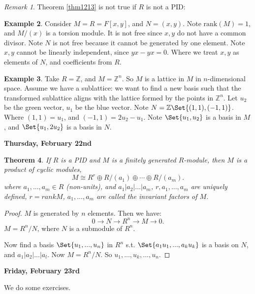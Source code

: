 \documentclass[9pt,reqno,twoside]{amsbook}
\theoremstyle{plain}
\newtheorem{theorem}{Theorem}[chapter]
\numberwithin{section}{chapter}
\numberwithin{equation}{chapter}
\theoremstyle{definition}
\newtheorem{Ex}[theorem]{Example}
\theoremstyle{remark}
\newtheorem{rem}[theorem]{Remark}
\theoremstyle{plain}
\newcommand{\z}{\mathbb{Z}}
\newcommand{\rank}{\text{rank}}
\begin{document}
\begin{rem}
Theorem \ref{thm1213} is not true if $R$ is not a PID:
\end{rem}

\begin{Ex}
Consider $M = R = F[x,y]$, and $N = (x,y)$. Note $\rank (M) = 1$, and $M/(x)$ is a torsion module. It is not free since $x,y$ do not have a common divisor. Note $N$ is not free because it cannot be generated by one element. Note $x,y$ cannot be linearly independent, since $yx - yx = 0$. Where we treat $x,y$ as elements of $N$, and coefficients from $R$. 
\end{Ex}

\begin{Ex}
Take $R = \z$, and $M = \z^n$. So $M$ is a lattice in $M$ in $n$-dimensional space. Assume we have a sublattice: we want to find a new basis such that the transformed sublattice aligns with the lattice formed by the points in $\z^n$. Let $u_2$ be the green vector, $u_1$ be the blue vector. Note $N = \z\Set{(1,1),(-1,1)}$. Where $(1,1) = u_1$, and $(-1,1) = 2u_2 - u_1$. Note $\Set{u_1,u_2}$ is a basis in $M$, and $\Set{u_1,2u_2}$ is a basis in $N$. 
\end{Ex}

\textbf{Thursday, February 22nd}

\begin{theorem}
If $R$ is a PID and $M$ is a finitely generated $R$-module, then $M$ is a product of cyclic modules, 
$$
M \cong R^r \oplus R/(a_1) \oplus \cdots \oplus R/(a_m).
$$
where $a_1,...,a_m \in R$ (non-units), and $a_1|a_2|...|a_m$,
 $r,a_1,...,a_m$ are uniquely defined, $r = rank M$, $a_1,...,a_m$ are called the invariant factors of $M$. 
\end{theorem}

\begin{proof}
$M$ is generated by $n$ elements. Then we have:
$$
0 \to N \to R^n \to M \to 0.
$$
$M = R^n/N$, where $N$ is a submodule of $R^n$. 

Now find a basis $\Set{u_1,...,u_n}$ in $R^n$ s.t. $\Set{a_1u_1,...,a_ku_k}$ is a basis on $N$, and $a_1|a_2|...|a_l$. Now $M = R^n/N$. So $u_1,...,u_k,...,u_n$. 
\end{proof}

\textbf{Friday, February 23rd}

We do some exercises. 
\end{document}
